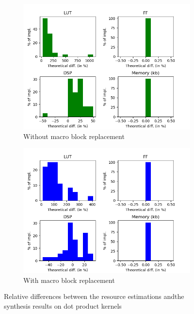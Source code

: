 \begin{figure}[h!]
    \centering
    \begin{subfigure}{1.0\textwidth}
        \centering
        \includegraphics[width=.8\textwidth]{Figures/results/dpRelativeWithoutMacro}
        \caption{Without macro block replacement}
        \label{ch.expe:sec.estimators:ssec.resource:fig.dp:sfig.without}
    \end{subfigure}
    \begin{subfigure}{1.0\textwidth}
        \centering
        \includegraphics[width=.8\textwidth]{Figures/results/dpRelativeWithMacro}
        \caption{With macro block replacement}
        \label{ch.expe:sec.estimators:ssec.resource:fig.dp:sfig.with}
    \end{subfigure}
    \caption[Quality of resource estimation on dot product]{Relative differences between the resource estimations and\newline the synthesis results on dot product kernels}
    \label{ch.expe:sec.estimators:ssec.resource:fig.dp}
\end{figure}
\clearpage
